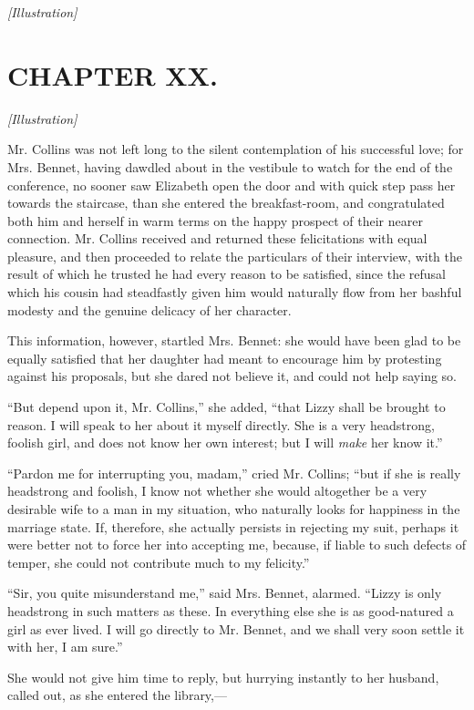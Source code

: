 \documentclass[12pt]{book}
\begin{document}
\emph{[Illustration]}

\chapter{CHAPTER XX.}

\emph{[Illustration]}

Mr. Collins was not left long to the silent contemplation of his successful love; for Mrs. Bennet, having dawdled about in the vestibule to watch for the end of the conference, no sooner saw Elizabeth open the door and with quick step pass her towards the staircase, than she entered the breakfast-room, and congratulated both him and herself in warm terms on the happy prospect of their nearer connection. Mr. Collins received and returned these felicitations with equal pleasure, and then proceeded to relate the particulars of their interview, with the result of which he trusted he had every reason to be satisfied, since the refusal which his cousin had steadfastly given him would naturally flow from her bashful modesty and the genuine delicacy of her character.

This information, however, startled Mrs. Bennet: she would have been glad to be equally satisfied that her daughter had meant to encourage him by protesting against his proposals, but she dared not believe it, and could not help saying so.

``But depend upon it, Mr. Collins,'' she added, ``that Lizzy shall be brought to reason. I will speak to her about it myself directly. She is a very headstrong, foolish girl, and does not know her own interest; but I will \textit{make} her know it.''

``Pardon me for interrupting you, madam,'' cried Mr. Collins; ``but if she is really headstrong and foolish, I know not whether she would altogether be a very desirable wife to a man in my situation, who naturally looks for happiness in the marriage state. If, therefore, she actually persists in rejecting my suit, perhaps it were better not to force her into accepting me, because, if liable to such defects of temper, she could not contribute much to my felicity.''

``Sir, you quite misunderstand me,'' said Mrs. Bennet, alarmed. ``Lizzy is only headstrong in such matters as these. In everything else she is as good-natured a girl as ever lived. I will go directly to Mr. Bennet, and we shall very soon settle it with her, I am sure.''

She would not give him time to reply, but hurrying instantly to her husband, called out, as she entered the library,---
\end{document}
